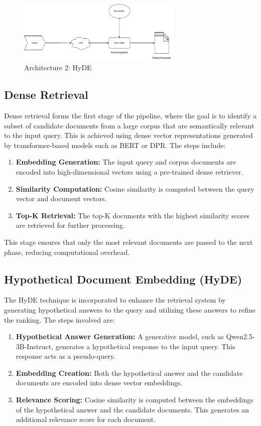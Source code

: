 \begin{figure}[ht]
    \centering
    \includegraphics[width=0.7\textwidth]{IMAGE/RAG_HyDE_archi.png}
    \caption{Architecture 2: HyDE}
    \label{fig:hyde_architecture}
\end{figure}

\subsection{Dense Retrieval}
Dense retrieval forms the first stage of the pipeline, where the goal is to identify a subset of candidate documents from a large corpus that are semantically relevant to the input query. This is achieved using dense vector representations generated by transformer-based models such as BERT or DPR. The steps include:
\begin{enumerate}
    \item \textbf{Embedding Generation:} The input query and corpus documents are encoded into high-dimensional vectors using a pre-trained dense retriever.
    \item \textbf{Similarity Computation:} Cosine similarity is computed between the query vector and document vectors.
    \item \textbf{Top-K Retrieval:} The top-K documents with the highest similarity scores are retrieved for further processing.
\end{enumerate}

This stage ensures that only the most relevant documents are passed to the next phase, reducing computational overhead.

\subsection{Hypothetical Document Embedding (HyDE)}
The HyDE technique is incorporated to enhance the retrieval system by generating hypothetical answers to the query and utilizing these answers to refine the ranking. The steps involved are:
\begin{enumerate}
    \item \textbf{Hypothetical Answer Generation:} A generative model, such as Qwen2.5-3B-Instruct\cite{qwen2.5}, generates a hypothetical response to the input query. This response acts as a pseudo-query.
    \item \textbf{Embedding Creation:} Both the hypothetical answer and the candidate documents are encoded into dense vector embeddings.
    \item \textbf{Relevance Scoring:} Cosine similarity is computed between the embeddings of the hypothetical answer and the candidate documents. This generates an additional relevance score for each document.
\end{enumerate}

